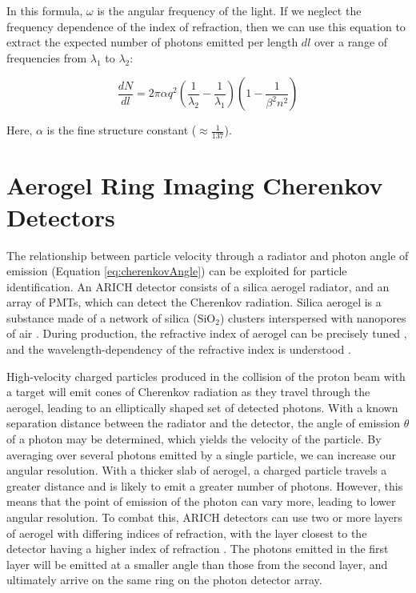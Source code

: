 In this formula, $\omega$ is the angular frequency of the light.
If we neglect the frequency dependence of the index of refraction, then we can use this equation to extract the expected number of photons emitted per length $dl$ over a range of frequencies from $\lambda_1$ to $\lambda_2$:

\begin{equation}
    \label{eq:photonNumber}
    \frac{dN}{dl}  = 2\pi\alpha q^2 \left(\frac{1}{\lambda_2} - \frac{1}{\lambda_1}
    \right)\left(1 - \frac{1}{\beta^2n^2}\right)
\end{equation}

Here, $\alpha$ is the fine structure constant ($\approx \frac{1}{137}$).



\section{Aerogel Ring Imaging Cherenkov Detectors}
\label{sec:ARICH}
The relationship between particle velocity through a radiator and photon angle of emission (Equation \ref{eq:cherenkovAngle}) can be exploited for particle identification.
An \ac{ARICH} detector consists of a silica aerogel radiator, and an array of \ac{PMT}s, which can detect the Cherenkov radiation.
Silica aerogel is a substance made of a network of silica (SiO$_2$) clusters interspersed with nanopores of air \cite{aerogelRefraction}.
During production, the refractive index of aerogel can be precisely tuned \cite{aerogelRefraction}, and the wavelength-dependency of the refractive index is understood \cite{aerogelWavelength}. 

High-velocity charged particles produced in the collision of the proton beam with a target will emit cones of Cherenkov radiation as they travel through the aerogel, leading to an elliptically shaped set of detected photons.
With a known separation distance between the radiator and the detector, the angle of emission $\theta$ of a photon may be determined, which yields the velocity of the particle.
By averaging over several photons emitted by a single particle, we can increase our angular resolution.
With a thicker slab of aerogel, a charged particle travels a greater distance and is likely to emit a greater number of photons.
However, this means that the point of emission of the photon can vary more, leading to lower angular resolution.
To combat this, \ac{ARICH} detectors can use two or more layers of aerogel with differing indices of refraction, with the layer closest to the detector having a higher index of refraction \cite{belleArich}.
The photons emitted in the first layer will be emitted at a smaller angle than those from the second layer, and ultimately arrive on the same ring on the photon detector array.

